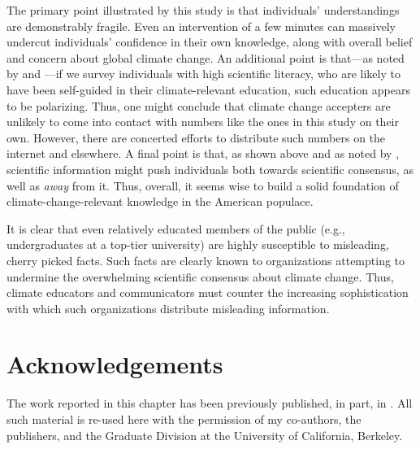 The primary point illustrated by this study is that individuals' understandings
are demonstrably fragile. Even an intervention of a few minutes can massively
undercut individuals' confidence in their own knowledge, along with overall
belief and concern about global climate change. An additional point is that---as
noted by \textcite{kahan_polarizing_2012} and
\textcite{mccright_politicization_2011}---if we survey individuals with high
scientific literacy, who are likely to have been self-guided in their
climate-relevant education, such education appears to be polarizing. Thus, one
might conclude that climate change accepters are unlikely to come into contact
with numbers like the ones in this study on their own.  However, there are
concerted efforts to distribute such numbers on the internet and elsewhere. A
final point is that, as shown above and as noted by
\textcite{mccright_politicization_2011}, scientific information might push
individuals both towards scientific consensus, as well as \emph{away} from it.
Thus, overall, it seems wise to build a solid foundation of climate-change-relevant
knowledge in the American populace. 

It is clear that even relatively educated members of the public (e.g.,
undergraduates at a top-tier university) are highly susceptible to misleading,
cherry picked facts. Such facts are clearly known to organizations attempting to
undermine the overwhelming scientific consensus about climate change. Thus,
climate educators and communicators must counter the increasing sophistication
with which such organizations distribute misleading information.

\section*{Acknowledgements}

The work reported in this chapter has been previously published, in part, in
\textcite{clark_knowledge_inpress}.  All such material is re-used here with the
permission of my co-authors, the publishers, and the Graduate Division at the
University of California, Berkeley.
